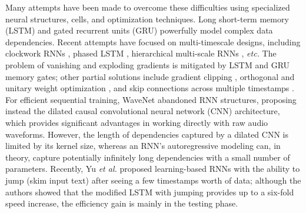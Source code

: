 \documentclass{article}
\begin{document}
Many attempts have been made to overcome these difficulties using specialized neural structures, cells, and optimization techniques. Long short-term memory (LSTM) \cite{hochreiter1997long} and gated recurrent units (GRU) \cite{chung2014empirical} powerfully model complex data dependencies. Recent attempts have focused on multi-timescale designs, including clockwork RNNs \cite{koutnik2014clockwork}, phased LSTM \cite{Neil2016phased}, hierarchical multi-scale RNNs \cite{chung2016hierarchical}, {\em etc.} The problem of vanishing and exploding gradients is mitigated by LSTM and GRU memory gates; other partial solutions include gradient clipping \cite{pascanu2013difficulty}, orthogonal and unitary weight optimization \cite{arjovsky2016unitary, le2015simple, wisdom2016full}, and skip connections across multiple timestamps \cite{el1995hierarchical, zhang2016architectural}.  For efficient sequential training, WaveNet \cite{van2016wavenet} abandoned RNN structures, proposing instead the dilated causal convolutional neural network (CNN) architecture, which provides significant advantages in working directly with raw audio waveforms.  However, the length of dependencies captured by a dilated CNN is limited by its kernel size, whereas an RNN's autoregressive modeling can, in theory, capture potentially infinitely long dependencies with a small number of parameters.  Recently, Yu {\em et al.} \cite{yu2017learning} proposed learning-based RNNs with the ability to jump (skim input text) after seeing a few timestamps worth of data; although the authors showed that the modified LSTM with jumping provides up to a six-fold speed increase, the efficiency gain is mainly in the testing phase. 
\end{document}

